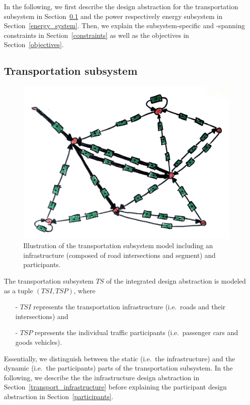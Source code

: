 In the following, we first describe the design abstraction for the transportation subsystem in Section~\ref{transport} and the power respectively energy subsystem in Section~\ref{energy_system}. Then, we explain the subsystem-specific and -spanning constraints in Section~\ref{constraints} as well as the objectives in Section~\ref{objectives}. 

\subsection{Transportation subsystem}
\label{transport}

\begin{figure}[h]
	\includegraphics[width=\columnwidth]{./gfx/transportation_system.jpg}
	\caption{Illustration of the transportation subsystem model including an infrastructure (composed of road intersections and segment) and participants.}
\end{figure}

The transportation subsystem $TS$ of the integrated design abstraction is modeled as a tuple $(TSI, TSP)$, where
\begin{itemize}
	\item[-] $TSI$ represents the transportation infrastructure (i.e.\ roads and their intersections) and
	\item[-] $TSP$ represents the individual traffic participants (i.e.\ passenger cars and goods vehicles).
\end{itemize}
Essentially, we distinguish between the static (i.e.\ the infrastructure) and the dynamic (i.e.\ the participants) parts of the transportation subsystem. In the following, we describe the the infrastructure design abstraction in Section~\ref{transport_infrastructure} before explaining the participant design abstraction in Section~\ref{participants}.

